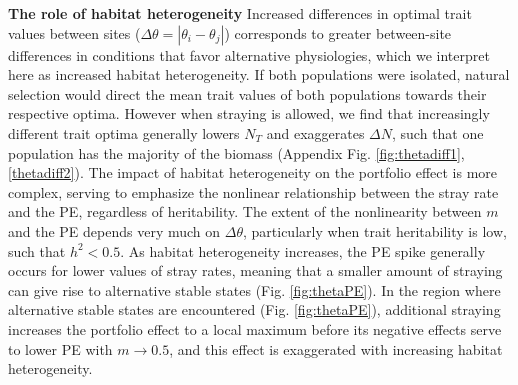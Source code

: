 \documentclass[twocolumn,preprintnumbers,amsmath,amssymb,superscriptaddress]{revtex4}
\begin{document}
 
{\bf The role of habitat heterogeneity} Increased differences in optimal trait values between sites ($\Delta\theta = \left|\theta_i - \theta_j\right|$) corresponds to greater between-site differences in conditions that favor alternative physiologies, which we interpret here as increased habitat heterogeneity.
If both populations were isolated, natural selection would direct the mean trait values of both populations towards their respective optima.
However when straying is allowed, we find that increasingly different trait optima generally lowers $N_T$ and exaggerates $\Delta N$, such that one population has the majority of the biomass (Appendix Fig. \ref{fig:thetadiff1},\ref{thetadiff2}).
The impact of habitat heterogeneity on the portfolio effect is more complex, serving to emphasize the nonlinear relationship between the stray rate and the PE, regardless of heritability.
The extent of the nonlinearity between $m$ and the PE depends very much on $\Delta\theta$, particularly when trait heritability is low, such that $h^2<0.5$.
As habitat heterogeneity increases, the PE spike generally occurs for lower values of stray rates, meaning that a smaller amount of straying can give rise to alternative stable states (Fig. \ref{fig:thetaPE}).
In the region where alternative stable states are encountered (Fig. \ref{fig:thetaPE}), additional straying increases the portfolio effect to a local maximum before its negative effects serve to lower PE with $m\rightarrow 0.5$, and this effect is exaggerated with increasing habitat heterogeneity.

\end{document}
